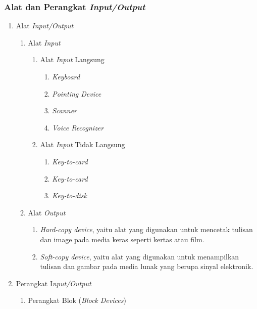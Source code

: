 \documentclass[12pt]{article}
\begin{document}
\subsubsection{Alat dan Perangkat \textit{Input/Output}}
\begin{enumerate}
    \item Alat \textit{Input/Output}
    \begin{enumerate}
        \item Alat \textit{Input}
        \begin{enumerate}
            \item Alat \textit{Input} Langsung
            \begin{enumerate}
                \item \textit{Keyboard}
                \item \textit{Pointing Device}
                \item \textit{Scanner}
                \item \textit{Voice Recognizer}
            \end{enumerate}
            \item Alat \textit{Input} Tidak Langsung
            \begin{enumerate}
                \item \textit{Key-to-card}
                \item \textit{Key-to-card}
                \item \textit{Key-to-disk}
            \end{enumerate}
        \end{enumerate}
        \item Alat \textit{Output}
        \begin{enumerate}
            \item \textit{Hard-copy device}, yaitu alat yang digunakan untuk mencetak tulisan dan image pada media keras seperti kertas atau film.
            \item \textit{Soft-copy device}, yaitu alat yang digunakan untuk menampilkan tulisan dan gambar pada media lunak yang berupa sinyal elektronik.
        \end{enumerate}
    \end{enumerate}
    \item Perangkat I\textit{nput/Output}
    \begin{enumerate}
        \item Perangkat Blok (\textit{Block Devices})
        \begin{enumerate}

\end{enumerate}
\end{enumerate}
\end{enumerate}
\end{document}
